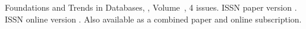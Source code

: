 \journallibraryinfo
 {%
  Foundations and Trends\textsuperscript{\textregistered} in
  Databases, ,
  Volume~, 4 issues.
  ISSN paper version .
  ISSN online version .
  Also available as a combined paper and online
  subscription.
 } 